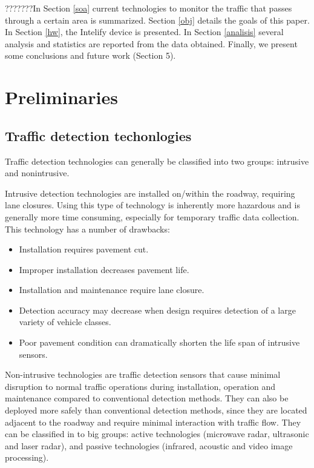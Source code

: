 \documentclass[preprint,authoryear,12pt]{elsarticle}
\begin{document}
???????In Section \ref{soa} current technologies to monitor the traffic that passes through a certain area is summarized.
Section \ref{obj} details the goals of this paper.
In Section \ref{hw}, the Intelify device is presented.
In Section \ref{analisis} several analysis and statistics are reported from the data obtained.
Finally, we present some conclusions and future work (Section 5).


\section{Preliminaries}
\label{sec:soa}

\subsection{Traffic detection techonlogies}
\label{subsec:traffic}

Traffic detection technologies can generally be classified into two groups: intrusive and nonintrusive.

Intrusive detection technologies are installed on/within the roadway, requiring lane closures. Using this type of technology is inherently more hazardous and is generally more time consuming, especially for temporary traffic data collection. This technology has a number of drawbacks:
\begin{itemize}
  \item Installation requires pavement cut.
  \item Improper installation decreases pavement life.
  \item Installation and maintenance require lane closure.
  \item Detection accuracy may decrease when design requires detection of a large variety of vehicle classes.
  \item Poor pavement condition can dramatically shorten the life span of intrusive sensors.
\end{itemize}

Non-intrusive technologies are traffic detection sensors that cause minimal disruption to normal traffic operations during installation, operation and maintenance compared to conventional detection methods. They can also be deployed more safely than conventional detection methods, since they are located adjacent to the roadway and require minimal interaction with traffic flow. They can be classified in to big groups: active technologies (microwave radar, ultrasonic and laser radar), and passive technologies (infrared, acoustic and video image processing). 
\end{document}
